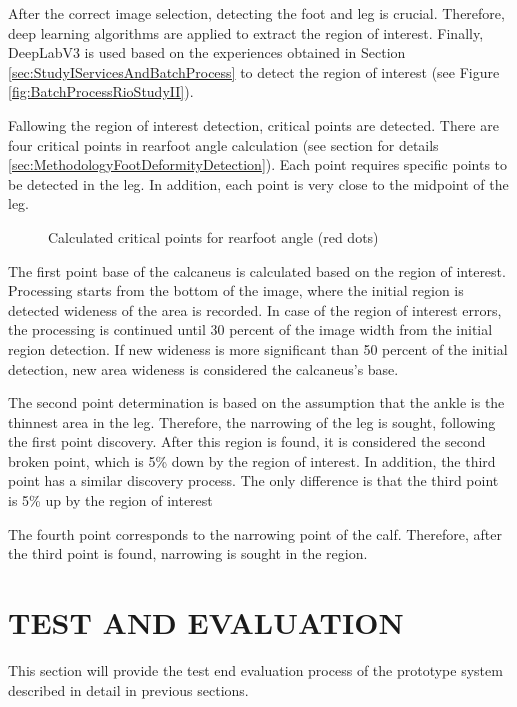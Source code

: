 After the correct image selection, detecting the foot and leg is crucial. Therefore, deep learning algorithms are applied to extract the region of interest. Finally, DeepLabV3 is used based on the experiences obtained in Section \ref{sec:StudyIServicesAndBatchProcess} to detect the region of interest (see Figure \ref{fig:BatchProcessRioStudyII}).

Fallowing the region of interest detection, critical points are detected. There are four critical points in rearfoot angle calculation (see section for details \ref{sec:MethodologyFootDeformityDetection}). Each point requires specific points to be detected in the leg. In addition, each point is very close to the midpoint of the leg.

\begin{figure}[htbp]
\centering
{}
\caption{Calculated critical points for rearfoot angle (red dots)}
\label{fig:BatchProcessDotsStudyII}
\end{figure}

The first point base of the calcaneus is calculated based on the region of interest. Processing starts from the bottom of the image, where the initial region is detected wideness of the area is recorded. In case of the region of interest errors, the processing is continued until 30 percent of the image width from the initial region detection. If new wideness is more significant than 50 percent of the initial detection, new area wideness is considered the calcaneus's base.

The second point determination is based on the assumption that the ankle is the thinnest area in the leg. Therefore, the narrowing of the leg is sought, following the first point discovery. After this region is found, it is considered the second broken point, which is 5\% down by the region of interest. In addition, the third point has a similar discovery process. The only difference is that the third point is 5\% up by the region of interest

The fourth point corresponds to the narrowing point of the calf. Therefore, after the third point is found, narrowing is sought in the region.

\section{TEST AND EVALUATION}\label{sec:StudyIITestAndEvaluation}

This section will provide the test end evaluation process of the prototype system described in detail in previous sections. 

